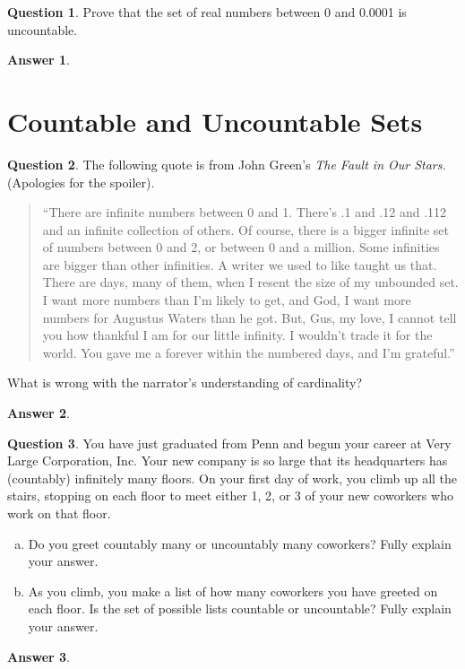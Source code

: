 \documentclass[article, 12pt]{article}
\theoremstyle{definition}
\newtheorem{question}{Question}
\newtheorem{answer}{Answer}
\begin{document}
    \begin{question}
        Prove that the set of real numbers between 0 and 0.0001 is uncountable.
    \end{question}

    \begin{answer}
    
    \end{answer}

    \section{Countable and Uncountable Sets}
    
    \begin{question}
        The following quote is from John Green's \textit{The Fault in Our Stars.} (Apologies for the spoiler).
        \begin{quotation}
            \noindent``There are infinite numbers between 0 and 1. There's .1 and .12 and .112 and an infinite collection of others. Of course, there is a bigger infinite set of numbers between 0 and 2, or between 0 and a million. Some infinities are bigger than other infinities. A writer we used to like taught us that. There are days, many of them, when I resent the size of my unbounded set. I want more numbers than I'm likely to get, and God, I want more numbers for Augustus Waters than he got. But, Gus, my love, I cannot tell you how thankful I am for our little infinity. I wouldn't trade it for the world. You gave me a forever within the numbered days, and I'm grateful.''
        \end{quotation}
        What is wrong with the narrator's understanding of cardinality?
    \end{question}

    \begin{answer}
        
    \end{answer}

    \begin{question}
        You have just graduated from Penn and begun your career at Very Large Corporation, Inc.
        Your new company is so large that its headquarters has (countably) infinitely many floors.
        On your first day of work, you climb up all the stairs, stopping on each floor to meet either 1, 2, or 3 of your new coworkers who work on that floor.

        \begin{enumerate}[a)]
            \item Do you greet countably many or uncountably many coworkers? Fully explain your
            answer.
            \item As you climb, you make a list of how many coworkers you have greeted on each floor. Is the set of possible lists countable or uncountable? Fully explain your answer.
        \end{enumerate}
    \end{question}

    \begin{answer}
        
    \end{answer}

\end{document}
